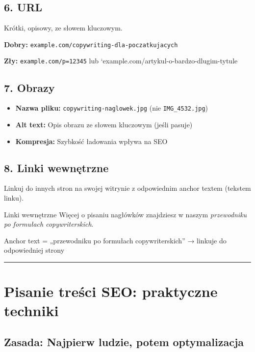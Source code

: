 \documentclass[
  12pt,
  a4paper,
  twoside,
  openright,
  12pt,
  DIV=12,
  BCOR=12mm]{scrbook}
\providecommand{\tightlist}{%
  \setlength{\itemsep}{0pt}\setlength{\parskip}{0pt}}\usepackage{longtable,booktabs,array}
\newcommand{\decoline}{%
  \begin{center}
    \textcolor{bordergray}{\rule{0.3\textwidth}{0.5pt}}
  \end{center}
}
\begin{document}
\subsection{6. URL}\label{url}

Krótki, opisowy, ze słowem kluczowym.

\textbf{Dobry:} \texttt{example.com/copywriting-dla-poczatkujacych}

\textbf{Zły:} \texttt{example.com/p=12345} lub
`example.com/artykul-o-bardzo-dlugim-tytule

\subsection{7. Obrazy}\label{obrazy}

\begin{itemize}
\tightlist
\item
  \textbf{Nazwa pliku:} \texttt{copywriting-naglowek.jpg} (nie
  \texttt{IMG\_4532.jpg})
\item
  \textbf{Alt text:} Opis obrazu ze słowem kluczowym (jeśli pasuje)
\item
  \textbf{Kompresja:} Szybkość ładowania wpływa na SEO
\end{itemize}

\subsection{8. Linki wewnętrzne}\label{linki-wewnux119trzne}

Linkuj do innych stron na swojej witrynie z odpowiednim anchor textem
(tekstem linku).

\begin{przyklad}{Linki wewnętrzne}
Więcej o pisaniu nagłówków znajdziesz w naszym \textit{przewodniku po formułach copywriterskich}.

Anchor text = „przewodniku po formułach copywriterskich” → linkuje do odpowiedniej strony
\end{przyklad}

\decoline

\section{Pisanie treści SEO: praktyczne
techniki}\label{pisanie-treux15bci-seo-praktyczne-techniki}

\subsection{Zasada: Najpierw ludzie, potem
optymalizacja}\label{zasada-najpierw-ludzie-potem-optymalizacja}
\end{document}
